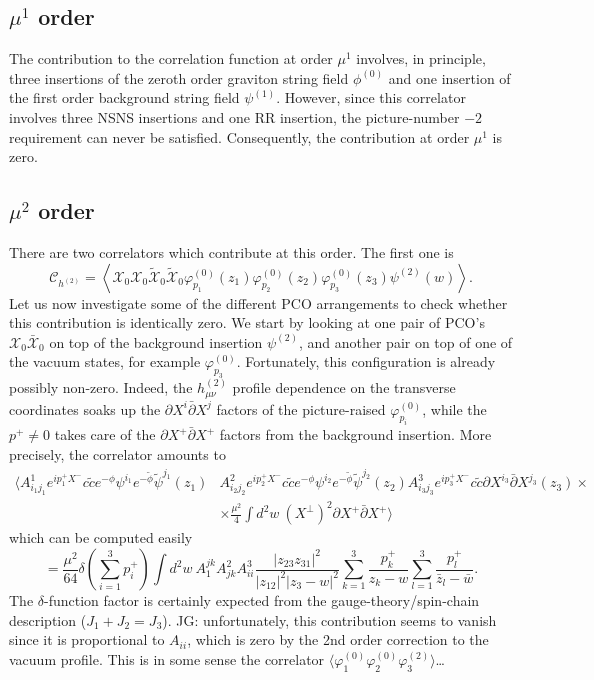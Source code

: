 \documentclass[12pt]{article}
\numberwithin{equation}{section}
\newcommand{\WT}[1]{\widetilde{#1}}
\newcommand{\B}[1]{\bar{#1}}
\begin{document}
\subsection{$\mu^1$ order}
The contribution to the correlation function at order $\mu^1$ involves, in principle, three insertions of the zeroth order graviton string field $\phi^{(0)}$ and one insertion of the first order background string field $\psi^{(1)}$. However, since this correlator involves three NSNS insertions and one RR insertion, the picture-number $-2$ requirement can never be satisfied. Consequently, the contribution at order $\mu^1$ is zero.

\subsection{$\mu^2$ order}
There are two correlators which contribute at this order. The first one is
\begin{equation}
    \mathcal{C}_{h^{(2)}}=\left\langle \mathcal{X}_0\mathcal{X}_0\WT{\mathcal{X}}_0\WT{\mathcal{X}}_0 \varphi_{p_1}^{(0)}(z_1)\varphi_{p_2}^{(0)}(z_2)\varphi_{p_3}^{(0)}(z_3)\psi^{(2)}(w)\right\rangle.
\end{equation}
Let us now investigate some of the different PCO arrangements to check whether this contribution is identically zero. We start by looking at one pair of PCO's $\mathcal{X}_0\B{\mathcal{X}}_0$ on top of the background insertion $\psi^{(2)}$, and another pair on top of one of the vacuum states, for example $\varphi_{p_3}^{(0)}$. Fortunately, this configuration is already possibly non-zero. Indeed, the $h_{\mu\nu}^{(2)}$ profile dependence on the transverse coordinates soaks up the $\partial X^i \B{\partial}X^j$ factors of the picture-raised $\varphi_{p_i}^{(0)}$, while the $p^+\neq0$ takes care of the $\partial X^+\B{\partial}X^+$ factors from the background insertion. More precisely, the correlator amounts to
\begin{equation}
\begin{split}
    \bigg\langle A_{i_1j_1}^1 e^{ip_1^+X^-}c\WT{c}e^{-\phi}\psi^{i_1}e^{-\WT{\phi}}\WT{\psi}^{j_1}(z_1)&A_{i_2j_2}^2 e^{ip_2^+X^-}c\WT{c}e^{-\phi}\psi^{i_2}e^{-\WT{\phi}}\WT{\psi}^{j_2}(z_2)A_{i_3j_3}^3 e^{ip_3^+X^-}c\WT{c}\partial X^{i_3}\B{\partial}X^{j_3}(z_3)\times\\
    &\times\frac{\mu^2}{4}\int d^2w\ (X^{\perp})^2\partial X^+\B{\partial}X^+\bigg\rangle
\end{split}
\end{equation}
which can be computed easily
\begin{equation}
    =\frac{\mu^2}{64}\delta\left(\sum_{i=1}^3p_i^+\right) \int d^2w\ A_1^{jk} A_{jk}^2 A^3_{ii} \frac{|z_{23}z_{31}|^2}{|z_{12}|^2|z_3-w|^2}\sum_{k=1}^3\frac{p_k^+}{z_k-w}\sum_{l=1}^3\frac{p_l^+}{\B{z}_l-\B{w}}.
\end{equation}
The $\delta$-function factor is certainly expected from the gauge-theory/spin-chain description ($J_1+J_2=J_3$). \textcolor{scpurple}{JG: unfortunately, this contribution seems to vanish since it is proportional to $A_{ii}$, which is zero by the 2nd order correction to the vacuum profile. This is in some sense the correlator $\langle \varphi^{(0)}_1 \varphi^{(0)}_2 \varphi^{(2)}_3\rangle$\dots}
\end{document}
